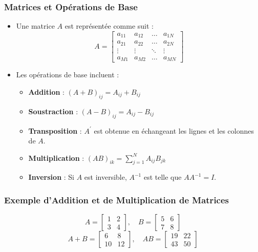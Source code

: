 \documentclass{beamer}
\begin{document}
\begin{frame}
  \frametitle{Matrices et Opérations de Base}
  \begin{itemize}
    \item Une matrice \(A\) est représentée comme suit :
    \[
    A = \begin{bmatrix} 
    a_{11} & a_{12} & \dots & a_{1N} \\ 
    a_{21} & a_{22} & \dots & a_{2N} \\ 
    \vdots & \vdots & \ddots & \vdots \\ 
    a_{M1} & a_{M2} & \dots & a_{MN} 
    \end{bmatrix}
    \]
    \item Les opérations de base incluent :
      \begin{itemize}
        \item \textbf{Addition} : \((A + B)_{ij} = A_{ij} + B_{ij}\)
        \item \textbf{Soustraction} : \((A - B)_{ij} = A_{ij} - B_{ij}\)
        \item \textbf{Transposition} : \(A^{\prime}\) est obtenue en échangeant les lignes et les colonnes de \(A\).
        \item \textbf{Multiplication} : \((AB)_{ik} = \sum_{j=1}^{N} A_{ij}B_{jk}\)
        \item \textbf{Inversion} : Si \(A\) est inversible, \(A^{-1}\) est telle que \(AA^{-1} = I\).
      \end{itemize}
  \end{itemize}
\end{frame}

\begin{frame}
  \frametitle{Exemple d'Addition et de Multiplication de Matrices}
  \[
  A = \begin{bmatrix} 
  1 & 2 \\ 
  3 & 4 
  \end{bmatrix}, \quad
  B = \begin{bmatrix} 
  5 & 6 \\ 
  7 & 8 
  \end{bmatrix}
  \]
  \[
  A + B = \begin{bmatrix} 
  6 & 8 \\ 
  10 & 12 
  \end{bmatrix}, \quad
  AB = \begin{bmatrix} 
  19 & 22 \\ 
  43 & 50 
  \end{bmatrix}
  \]
\end{frame}
\end{document}
